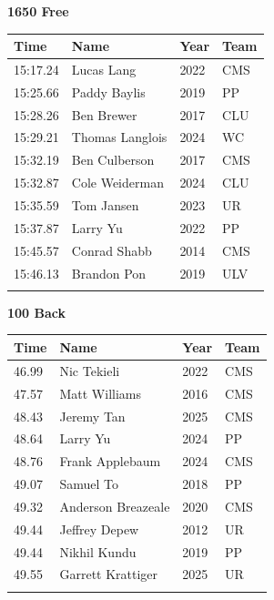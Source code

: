 \vspace{1.2em}
\noindent\begin{minipage}[t]{0.98\textwidth}
\centering
\textbf{\textcolor{teamprimary}{1650 Free}}\par
\vspace{0.5em}
\centering
\small
\renewcommand{\arraystretch}{1.0}
\setlength{\tabcolsep}{4pt}
\begin{tabular}{@{}p{2.5cm}p{4.5cm}p{1.5cm}p{2.5cm}@{}}
\toprule
\textbf{Time} & \textbf{Name} & \textbf{Year} & \textbf{Team} \\
\midrule
15:17.24 & Lucas Lang & 2022 & CMS \\
15:25.66 & Paddy Baylis & 2019 & PP \\
15:28.26 & Ben Brewer & 2017 & CLU \\
15:29.21 & Thomas Langlois & 2024 & WC \\
15:32.19 & Ben Culberson & 2017 & CMS \\
15:32.87 & Cole Weiderman & 2024 & CLU \\
15:35.59 & Tom Jansen & 2023 & UR \\
15:37.87 & Larry Yu & 2022 & PP \\
15:45.57 & Conrad Shabb & 2014 & CMS \\
15:46.13 & Brandon Pon & 2019 & ULV \\
\bottomrule
\vspace{0.5em}
\end{tabular}
\end{minipage}
\vspace{1.2em}
\noindent\begin{minipage}[t]{0.98\textwidth}
\centering
\textbf{\textcolor{teamprimary}{100 Back}}\par
\vspace{0.5em}
\centering
\small
\renewcommand{\arraystretch}{1.0}
\setlength{\tabcolsep}{4pt}
\begin{tabular}{@{}p{2.5cm}p{4.5cm}p{1.5cm}p{2.5cm}@{}}
\toprule
\textbf{Time} & \textbf{Name} & \textbf{Year} & \textbf{Team} \\
\midrule
46.99 & Nic Tekieli & 2022 & CMS \\
47.57 & Matt Williams & 2016 & CMS \\
48.43 & Jeremy Tan & 2025 & CMS \\
48.64 & Larry Yu & 2024 & PP \\
48.76 & Frank Applebaum & 2024 & CMS \\
49.07 & Samuel To & 2018 & PP \\
49.32 & Anderson Breazeale & 2020 & CMS \\
49.44 & Jeffrey Depew & 2012 & UR \\
49.44 & Nikhil Kundu & 2019 & PP \\
49.55 & Garrett Krattiger & 2025 & UR \\
\bottomrule
\vspace{0.5em}
\end{tabular}
\end{minipage}
